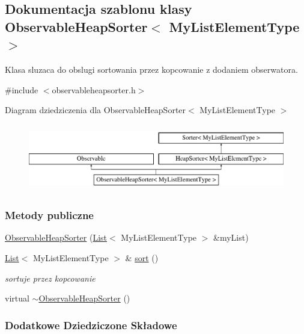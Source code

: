 \hypertarget{class_observable_heap_sorter}{\subsection{Dokumentacja szablonu klasy Observable\-Heap\-Sorter$<$ My\-List\-Element\-Type $>$}
\label{class_observable_heap_sorter}
}


Klasa sluzaca do obslugi sortowania przez kopcowanie z dodaniem obserwatora.  




{\ttfamily \#include $<$observableheapsorter.\-h$>$}

Diagram dziedziczenia dla Observable\-Heap\-Sorter$<$ My\-List\-Element\-Type $>$\begin{figure}[H]
\begin{center}
\leavevmode
\includegraphics[height=2.957747cm]{class_observable_heap_sorter}
\end{center}
\end{figure}
\subsubsection*{Metody publiczne}
\begin{DoxyCompactItemize}
\item 
\hyperlink{class_observable_heap_sorter_a3102c57c74f30fb5b5be17f2d2c5bd68}{Observable\-Heap\-Sorter} (\hyperlink{class_list}{List}$<$ My\-List\-Element\-Type $>$ \&my\-List)
\item 
\hyperlink{class_list}{List}$<$ My\-List\-Element\-Type $>$ \& \hyperlink{class_observable_heap_sorter_a5e92d70e5a769ba7249f974a48b94bd0}{sort} ()
\begin{DoxyCompactList}\small\item\em sortuje przez kopcowanie \end{DoxyCompactList}\item 
virtual \hyperlink{class_observable_heap_sorter_a46e45f721463f961065eb0e78ab17e12}{$\sim$\-Observable\-Heap\-Sorter} ()
\end{DoxyCompactItemize}
\subsubsection*{Dodatkowe Dziedziczone Składowe}


